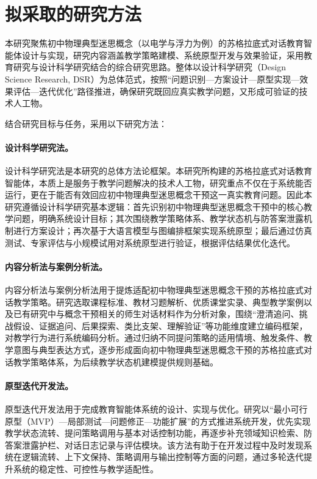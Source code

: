 \section{拟采取的研究方法}

本研究聚焦初中物理典型迷思概念（以电学与浮力为例）的苏格拉底式对话教育智能体设计与实现，研究内容涵盖教学策略建模、系统原型开发与效果验证，采用教育研究与设计科学研究结合的综合研究思路。整体以设计科学研究（Design Science Research, DSR）为总体范式，按照“问题识别—方案设计—原型实现—效果评估—迭代优化”路径推进，确保研究既回应真实教学问题，又形成可验证的技术人工物。

结合研究目标与任务，采用以下研究方法：


\paragraph{设计科学研究法。}

设计科学研究法是本研究的总体方法论框架。本研究所构建的苏格拉底式对话教育智能体，本质上是服务于教学问题解决的技术人工物，研究重点不仅在于系统能否运行，更在于能否有效回应初中物理典型迷思概念干预这一真实教育问题。因此本研究遵循设计科学研究基本逻辑：首先识别初中物理典型迷思概念干预中的核心教学问题，明确系统设计目标；其次围绕教学策略体系、教学状态机与防答案泄露机制进行方案设计；再次基于大语言模型与图编排框架实现系统原型；最后通过仿真测试、专家评估与小规模试用对系统原型进行验证，根据评估结果优化迭代。

\paragraph{内容分析法与案例分析法。}

内容分析法与案例分析法用于提炼适配初中物理典型迷思概念干预的苏格拉底式对话教学策略。研究选取课程标准、教材习题解析、优质课堂实录、典型教学案例以及已有研究中与概念干预相关的师生对话材料作为分析对象，围绕“澄清追问、挑战假设、证据追问、后果探索、类比支架、理解验证”等功能维度建立编码框架，对教学行为进行系统编码分析。通过归纳不同提问策略的适用情境、触发条件、教学意图与典型表达方式，逐步形成面向初中物理典型迷思概念干预的苏格拉底式对话教学策略体系，为后续教学状态机建模提供规则基础。

\paragraph{原型迭代开发法。}

原型迭代开发法用于完成教育智能体系统的设计、实现与优化。研究以“最小可行原型（MVP）—局部测试—问题修正—功能扩展”的方式推进系统开发，优先实现教学状态流转、提问策略调用与基本对话控制功能，再逐步补充领域知识检索、防答案泄露护栏、对话日志记录与评估模块。该方法有助于在开发过程中及时发现系统在逻辑流转、上下文保持、策略调用与输出控制等方面的问题，通过多轮迭代提升系统的稳定性、可控性与教学适配性。

